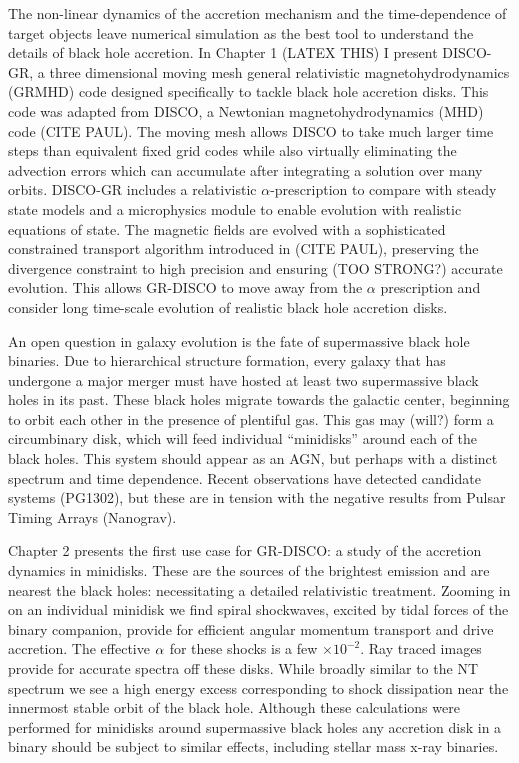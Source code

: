 The non-linear dynamics of the accretion mechanism and the time-dependence of target objects leave numerical simulation as the best tool to understand the details of black hole accretion.  In Chapter 1 (LATEX THIS) I present DISCO-GR, a three dimensional moving mesh general relativistic magnetohydrodynamics (GRMHD) code designed specifically to tackle black hole accretion disks.  This code was adapted from DISCO, a Newtonian magnetohydrodynamics (MHD) code (CITE PAUL).  The moving mesh allows DISCO to take much larger time steps than equivalent fixed grid codes while also virtually eliminating the advection errors which can accumulate after integrating a solution over many orbits.  DISCO-GR includes a relativistic $\alpha$-prescription to compare with steady state models and a microphysics module to enable evolution with realistic equations of state.  The magnetic fields are evolved with a sophisticated constrained transport algorithm introduced in (CITE PAUL), preserving the divergence constraint to high precision and ensuring (TOO STRONG?) accurate evolution.  This allows GR-DISCO to move away from the $\alpha$ prescription and consider long time-scale evolution of realistic black hole accretion disks.

An open question in galaxy evolution is the fate of supermassive black hole binaries.  Due to hierarchical structure formation, every galaxy that has undergone a major merger must have hosted at least two supermassive black holes in its past.  These black holes migrate towards the galactic center, beginning to orbit each other in the presence of plentiful gas.  This gas may (will?) form a circumbinary disk, which will feed individual ``minidisks'' around each of the black holes.  This system should appear as an AGN, but perhaps with a distinct spectrum and time dependence.  Recent observations have detected candidate systems (PG1302), but these are in tension with the negative results from Pulsar Timing Arrays (Nanograv).

Chapter 2 presents the first use case for GR-DISCO: a study of the accretion dynamics in minidisks.  These are the sources of the brightest emission and are nearest the black holes: necessitating a detailed relativistic treatment.  Zooming in on an individual minidisk we find spiral shockwaves, excited by tidal forces of the binary companion, provide for efficient angular momentum transport and drive accretion.  The effective $\alpha$ for these shocks is a few $\times 10^{-2}$.  Ray traced images provide for accurate spectra off these disks.  While broadly similar to the NT spectrum we see a high energy excess corresponding to shock dissipation near the innermost stable orbit of the black hole.  Although these calculations were performed for minidisks around supermassive black holes any accretion disk in a binary should be subject to similar effects, including stellar mass x-ray binaries.


